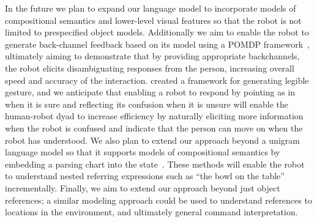 \documentclass[graybox]{svmult}
\begin{document}
In the future we plan to expand our language model to incorporate
models of compositional semantics and lower-level visual features so
that the robot is not limited to prespecified object models.
Additionally we aim to enable the robot to generate back-channel
feedback based on its model using a POMDP framework~\citep{kaelbling99}, ultimately aiming
to demonstrate that by providing appropriate backchannels, the robot
elicits disambiguating responses from the person, increasing overall
speed and accuracy of the interaction.  \citet{dragan13} created a
framework for generating legible gesture, and we anticipate that
enabling a robot to respond by pointing as in \citet{holladay14} when
it is sure and reflecting its confusion when it is unsure will enable
the human-robot dyad to increase efficiency by naturally eliciting
more information when the robot is confused and indicate that the
person can move on when the robot has understood.  We also plan to
extend our approach beyond a unigram language model so that it
supports models of compositional semantics by embedding a parsing
chart into the state~\citep{jurafsky95, earley70}.  These methods will
enable the robot to understand nested referring expressions such as
``the bowl on the table'' incrementally.  Finally, we aim to extend
our approach beyond just object references; a similar modeling
approach could be used to understand references to locations in the
environment, and ultimately general command interpretation. 






\citet{tellex11}




\end{document}
